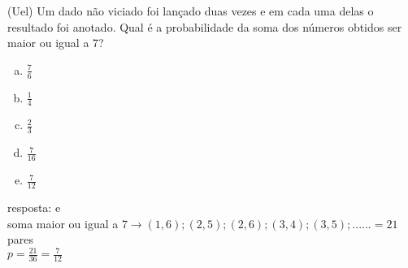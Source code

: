\begin{ex}
 (Uel) Um dado não viciado foi lançado duas vezes e em cada uma delas o resultado foi anotado. Qual é a probabilidade da soma dos números obtidos ser maior ou igual a 7?
    \begin{enumerate}[(a)]
    \item  $\frac{7}{6}$
    \item  $\frac{1}{4}$
    \item  $\frac{2}{3}$
    \item  $\frac{7}{16}$
    \item  $\frac{7}{12}$
    \end{enumerate} 
      \begin{sol}
        resposta: e \\
        soma maior ou igual a 7$\rightarrow (1,6);(2,5);(2,6);(3,4);(3,5);......=21$pares\\  $p=\frac{21}{36}=\frac{7}{12}$
      \end{sol}
\end{ex}